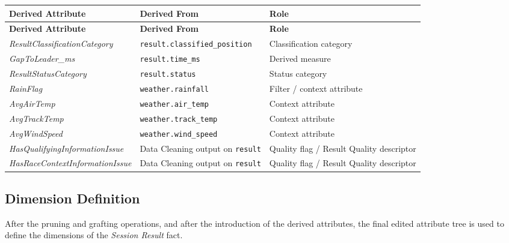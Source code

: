 \documentclass[a4paper,11pt]{article}
\begin{document}
	\begin{longtable}{|p{5.5cm}|p{5.4cm}|p{5.5cm}|}
		\hline
		\textbf{Derived Attribute} & \textbf{Derived From}  & \textbf{Role} \\
		\hline
		\endfirsthead
		
		\hline
		\textbf{Derived Attribute} & \textbf{Derived From}  & \textbf{Role} \\
		\hline
		\endhead
		
		\textit{ResultClassificationCategory}
		& \texttt{result.classified\_position}
		& Classification category \\
		\hline
		
		\textit{GapToLeader\_ms}
		& \texttt{result.time\_ms}
		& Derived measure \\
		\hline
		
		\textit{ResultStatusCategory}
		& \texttt{result.status}
		& Status category \\
		\hline
		
		\textit{RainFlag}
		& \texttt{weather.rainfall}
		& Filter / context attribute \\
		\hline
		
		\textit{AvgAirTemp}
		& \texttt{weather.air\_temp}
		& Context attribute \\
		\hline
		
		\textit{AvgTrackTemp}
		& \texttt{weather.track\_temp}
		& Context attribute \\
		\hline
		
		\textit{AvgWindSpeed}
		& \texttt{weather.wind\_speed}
		& Context attribute \\
		\hline
		
		\textit{HasQualifyingInformationIssue}
		& Data Cleaning output on \texttt{result}
		& Quality flag / Result Quality descriptor \\
		\hline
		
		\textit{HasRaceContextInformationIssue}
		& Data Cleaning output on \texttt{result}
		& Quality flag / Result Quality descriptor \\
		\hline
	\end{longtable}
	
	
	
	\subsection{Dimension Definition}
	
	After the pruning and grafting operations, and after the introduction of the derived
	attributes, the final edited attribute tree is used to define the dimensions of the
	\textit{Session Result} fact.
	
\end{document}
